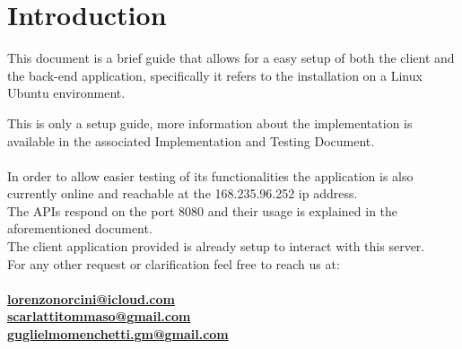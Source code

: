 \section{Introduction}

This document is a brief guide that allows for a easy setup of both the client and the back-end application, specifically it refers to the installation on a Linux Ubuntu environment.

This is only a setup guide, more information about the implementation is available in the associated Implementation and Testing Document.\\ \\
In order to allow easier testing of its functionalities the application is also currently online and reachable at the 168.235.96.252 ip address.\\
The APIs respond on the port 8080 and their usage is explained in the aforementioned document.\\
The client application provided is already setup to interact with this server.\\

\noindent
For any other request or clarification feel free to reach us at:\\ \\ \href{mailto:lorenzonorcini@icloud.com}{\textbf{lorenzonorcini@icloud.com}}\\
\href{mailto:scarlattitommaso@gmail.com}{\textbf{scarlattitommaso@gmail.com}}\\
\href{mailto:guglielmomenchetti.gm@gmail.com}{\textbf{guglielmomenchetti.gm@gmail.com}}
